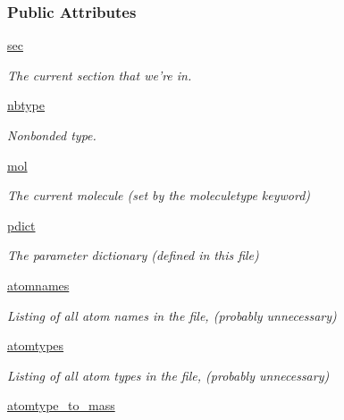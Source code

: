\subsubsection*{Public Attributes}
\begin{DoxyCompactItemize}
\item 
\hyperlink{classforcebalance_1_1gmxio_1_1ITP__Reader_a744b1698c9ccfc1be470d83862099551}{sec}
\begin{DoxyCompactList}\small\item\em The current section that we're in. \end{DoxyCompactList}\item 
\hyperlink{classforcebalance_1_1gmxio_1_1ITP__Reader_ad1485d8f448b3f12c5bce4f05a18cf8c}{nbtype}
\begin{DoxyCompactList}\small\item\em Nonbonded type. \end{DoxyCompactList}\item 
\hyperlink{classforcebalance_1_1gmxio_1_1ITP__Reader_a8d70d960437fa51e58954d908fdd297d}{mol}
\begin{DoxyCompactList}\small\item\em The current molecule (set by the moleculetype keyword) \end{DoxyCompactList}\item 
\hyperlink{classforcebalance_1_1gmxio_1_1ITP__Reader_a1c74f6a71b392ecbf20ccc1e12b0d321}{pdict}
\begin{DoxyCompactList}\small\item\em The parameter dictionary (defined in this file) \end{DoxyCompactList}\item 
\hyperlink{classforcebalance_1_1gmxio_1_1ITP__Reader_a0cbe42a9c0bf233255cfb8dd6ebe102e}{atomnames}
\begin{DoxyCompactList}\small\item\em Listing of all atom names in the file, (probably unnecessary) \end{DoxyCompactList}\item 
\hyperlink{classforcebalance_1_1gmxio_1_1ITP__Reader_a771f60fa6b3020c422062bb9ceb51291}{atomtypes}
\begin{DoxyCompactList}\small\item\em Listing of all atom types in the file, (probably unnecessary) \end{DoxyCompactList}\item 
\hyperlink{classforcebalance_1_1gmxio_1_1ITP__Reader_ae4ae7fb78a864a7ca15f68b376e84c35}{atomtype\-\_\-to\-\_\-mass}

\end{DoxyCompactItemize}
